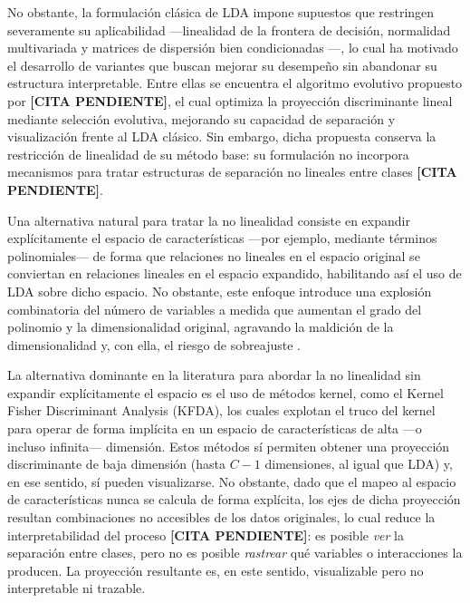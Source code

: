 	No obstante, la formulación clásica de LDA impone supuestos que restringen severamente su aplicabilidad —linealidad de la frontera de decisión, normalidad multivariada y matrices de dispersión bien condicionadas \cite{feng2021comparison}—, lo cual ha motivado el desarrollo de variantes que buscan mejorar su desempeño sin abandonar su estructura interpretable. Entre ellas se encuentra el algoritmo evolutivo propuesto por \textbf{[CITA PENDIENTE]}, el cual optimiza la proyección discriminante lineal mediante selección evolutiva, mejorando su capacidad de separación y visualización frente al LDA clásico. Sin embargo, dicha propuesta conserva la restricción de linealidad de su método base: su formulación no incorpora mecanismos para tratar estructuras de separación no lineales entre clases \textbf{[CITA PENDIENTE]}.
	
	Una alternativa natural para tratar la no linealidad consiste en expandir explícitamente el espacio de características —por ejemplo, mediante términos polinomiales— de forma que relaciones no lineales en el espacio original se conviertan en relaciones lineales en el espacio expandido, habilitando así el uso de LDA sobre dicho espacio. No obstante, este enfoque introduce una explosión combinatoria del número de variables a medida que aumentan el grado del polinomio y la dimensionalidad original, agravando la maldición de la dimensionalidad y, con ella, el riesgo de sobreajuste \cite{bishop2006pattern}.
	
	La alternativa dominante en la literatura para abordar la no linealidad sin expandir explícitamente el espacio es el uso de métodos kernel, como el Kernel Fisher Discriminant Analysis (KFDA), los cuales explotan el truco del kernel para operar de forma implícita en un espacio de características de alta —o incluso infinita— dimensión. Estos métodos sí permiten obtener una proyección discriminante de baja dimensión (hasta $C-1$ dimensiones, al igual que LDA) y, en ese sentido, sí pueden visualizarse. No obstante, dado que el mapeo al espacio de características nunca se calcula de forma explícita, los ejes de dicha proyección resultan combinaciones no accesibles de los datos originales, lo cual reduce la interpretabilidad del proceso \textbf{[CITA PENDIENTE]}: es posible \emph{ver} la separación entre clases, pero no es posible \emph{rastrear} qué variables o interacciones la producen. La proyección resultante es, en este sentido, visualizable pero no interpretable ni trazable.
	
